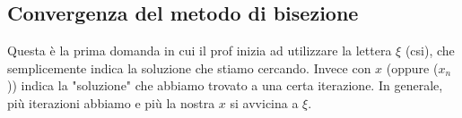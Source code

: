 \newpage
\subsection{Convergenza del metodo di bisezione}
Questa è la prima domanda in cui il prof inizia ad utilizzare la lettera $\xi$ (csi), che semplicemente indica la soluzione che stiamo cercando. Invece con $x$ (oppure ($x_n$)) indica la "soluzione" che abbiamo trovato a una certa iterazione. In generale, più iterazioni abbiamo e più la nostra $x$ si avvicina a $\xi$.\\